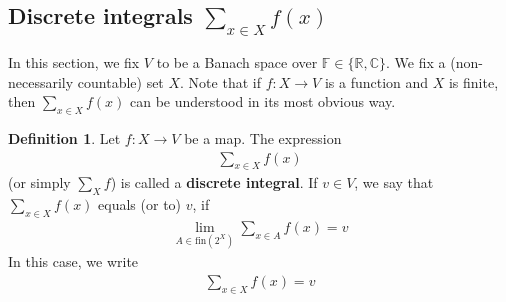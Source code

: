 \documentclass[12pt,b5paper,notitlepage]{article}
\theoremstyle{definition}
\newtheorem{df}{Definition}[section]
\theoremstyle{plain}
\newcommand{\Cbb}{\mathbb C}
\newcommand{\Nbb}{\mathbb N}
\newcommand{\Zbb}{\mathbb Z}
\newcommand{\Rbb}{\mathbb R}
\newcommand{\fin}{\mathrm{fin}}
\newcommand{\Fbb}{\mathbb F}
\numberwithin{equation}{section}
\begin{document}
\begin{comment}
\begin{proof}
Let $(x_\alpha)_{\alpha\in I}$ be a Cauchy net in a complete metric space $X$. Then $I\times \Nbb$ is a directed set. Define
\begin{align*}
S=\{(\alpha,n)\in I\times\Nbb:\forall \beta,\gamma\geq\alpha\text{ we have }d(x_\beta,x_\gamma)<1/n\}
\end{align*}
Then $(x_\alpha)_{(\alpha,n)\in S}$ is a subnet of $X$. Recall that every subnet of a Cauchy net is Cauchy. By Prop. \ref{lb127}, it suffices to show that the Cauchy net $(x_\alpha)_{(\alpha,n)\in S}$ converges.

For each $n\in\Zbb_+$, choose $\beta_n$ such that $(\beta_n,n)\in S$: the existence of $\beta_n$ is due to the Cauchyness of $(x_\alpha)_{\alpha\in I}$. Thus, if $(\alpha,n)\in S$, we have $d(x_\alpha,x_{\beta_n})<1/n$, and hence
\begin{align*}
\lim_{(\alpha,n)\in S}d(x_\alpha,x_{\beta_n})=0
\end{align*}
Therefore, by Exe. \ref{lb128}, it suffices to prove that the equivalent Cauchy net $(x_{\beta_n})_{(\alpha,n)\in S}$ is convergent. But this is a subnet of the sequence $(x_{\beta_n})_{n\in\Nbb}$. And clearly, the Cauchyness of $(x_{\beta_n})_{(\alpha,n)\in S}$ implies that of $(x_{\beta_n})_{n\in\Nbb}$. So the Cauchy sequence $(x_{\beta_n})_{n\in\Nbb}$ converges because $X$ is complete. So its subnet $(x_{\beta_n})_{(\alpha,n)\in S}$ converges.
\end{proof}
\end{comment}



\subsection{Discrete integrals $\sum_{x\in X}f(x)$}

In this section, we fix $V$ to be a Banach space over $\Fbb\in\{\Rbb,\Cbb\}$. We fix a (non-necessarily countable) set $X$. Note that if $f:X\rightarrow V$ is a function and $X$ is finite, then $\sum_{x\in X}f(x)$ can be understood in its most obvious way.



\begin{df}\label{lb131}
Let $f:X\rightarrow V$ be a map. The expression
\begin{align*}
\sum_{x\in X}f(x)
\end{align*}
(or simply $\sum_X f$) is called a \textbf{discrete integral}. If $v\in V$, we say that $\sum_{x\in X}f(x)$ equals (or  to) $v$, if
\begin{align}
\lim_{A\in\fin(2^X)}\sum_{x\in A}f(x)=v
\end{align}
In this case, we write
\begin{align}
\sum_{x\in X}f(x)=v \label{eq40}
\end{align}
\end{df}
\end{document}
